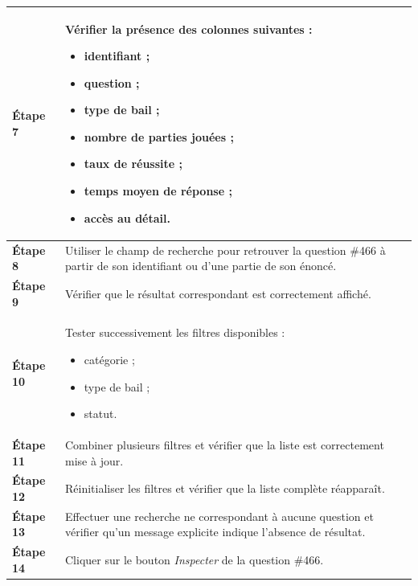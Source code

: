 \begin{longtable}{
    |>{\raggedright\arraybackslash}p{}
    |>{\raggedright\arraybackslash}p{}|
}
\textbf{Étape 7}
&
Vérifier la présence des colonnes suivantes :
\begin{itemize}[leftmargin=*,nosep]
    \item identifiant ;
    \item question ;
    \item type de bail ;
    \item nombre de parties jouées ;
    \item taux de réussite ;
    \item temps moyen de réponse ;
    \item accès au détail.
\end{itemize}
\\
\hline

\textbf{Étape 8}
&
Utiliser le champ de recherche pour retrouver la question \#466 à partir
de son identifiant ou d'une partie de son énoncé.
\\
\hline

\textbf{Étape 9}
&
Vérifier que le résultat correspondant est correctement affiché.
\\
\hline

\textbf{Étape 10}
&
Tester successivement les filtres disponibles :
\begin{itemize}[leftmargin=*,nosep]
    \item catégorie ;
    \item type de bail ;
    \item statut.
\end{itemize}
\\
\hline

\textbf{Étape 11}
&
Combiner plusieurs filtres et vérifier que la liste est correctement mise
à jour.
\\
\hline

\textbf{Étape 12}
&
Réinitialiser les filtres et vérifier que la liste complète réapparaît.
\\
\hline

\textbf{Étape 13}
&
Effectuer une recherche ne correspondant à aucune question et vérifier
qu'un message explicite indique l'absence de résultat.
\\
\hline

\textbf{Étape 14}
&
Cliquer sur le bouton \textit{Inspecter} de la question \#466.
\\
\hline


\end{longtable}
